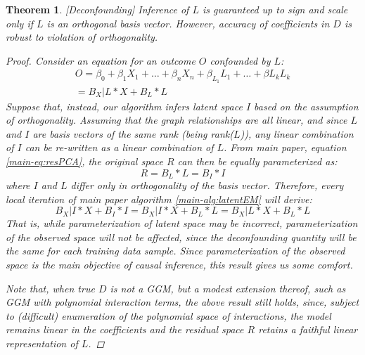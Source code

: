 \documentclass{article}
\newtheorem{theorem}{Theorem}
\begin{document}
\begin{theorem}
\label{thm:deconfounding}[Deconfounding]
Inference of $L$ is guaranteed up to sign and scale only if $L$ is an orthogonal basis vector.  However, accuracy of coefficients in $D$ is robust to violation of orthogonality.
\begin{proof}
Consider an equation for an outcome $O$ confounded by $L$:
\begin{equation}
\begin{split}
O = \beta_{0} + \beta_{1} X_1 + \ldots +\beta_{n} X_n + \beta_{L_1} L_1 + \ldots + \beta{L_k} L_k \\= B_X|L * X + B_L * L
\end{split}
\label{eq:confNonOrth}
\end{equation}
Suppose that, instead, our algorithm infers latent space $I$ based on the assumption of orthogonality.  Assuming that the graph relationships are all linear, and since $L$ and $I$ are basis vectors of the same rank (being rank($L$)), any linear combination of $I$ can be re-written as a linear combination of $L$.  From main paper, equation \ref{main-eq:resPCA}, the original space $R$ can then be equally parameterized as:
\begin{equation}
R = B_L * L = B_I * I
\end{equation}
where $I$ and $L$ differ only in orthogonality of the basis vector.   Therefore, every local iteration of main paper algorithm \ref{main-alg:latentEM} will derive:
\begin{equation}
B_X|I * X + B_I * I = B_X|I * X  + B_L * L = B_X|L * X + B_L * L
\end{equation}
That is, while parameterization of latent space may be incorrect, parameterization of the observed space will not be affected, since the deconfounding quantity will be the same for each training data sample.  Since parameterization of the observed space is the main objective of causal inference, this result gives us some comfort.  

Note that, when true $D$ is not a GGM, but a modest extension thereof, such as GGM with polynomial interaction terms, the above result still holds, since, subject to (difficult) enumeration of the polynomial space of interactions, the model remains linear in the coefficients and the residual space $R$ retains a faithful linear representation of $L$.
\end{proof}
\end{theorem}
\end{document}
